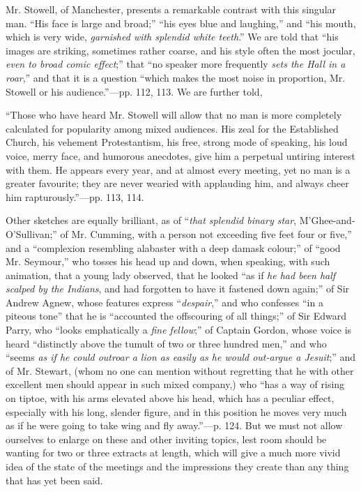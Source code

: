 Mr. Stowell,
of Manchester, presents a remarkable contrast with this singular man. ``His face is large and broad;''
``his eyes blue and laughing,'' and ``his mouth, which is very wide, \emph{garnished with splendid white teeth}.''
We are told that ``his images are striking, sometimes rather coarse,
and his style often the most jocular, \emph{even to broad comic effect};''
that ``no speaker more frequently \emph{sets the Hall in a roar},''
and that it is a question ``which makes the most noise in proportion,
Mr. Stowell or his audience.''—pp. 112, 113. We are further told,

``Those
who have heard Mr. Stowell will allow that no man is more completely
calculated for popularity among mixed audiences. His zeal for the
Established Church, his vehement Protestantism, his free, strong
mode of speaking, his loud voice, merry face, and humorous anecdotes,
give him a perpetual untiring interest with them. He appears every year,
and at almost every meeting, yet no man is a greater favourite; they are
never wearied with applauding him, and always cheer him
rapturously.''—pp. 113, 114.

Other
sketches are equally brilliant, as of ``\emph{that splendid binary star},
M'Ghee-and-O'Sullivan;'' of Mr. Cumming, with a person not
exceeding five feet four or five,'' and a ``complexion resembling
alabaster with a deep damask colour;'' of ``good Mr. Seymour,'' who
tosses his head up and down, when speaking, with such animation, that a
young lady observed, that he looked ``as if \emph{he had been half scalped
by the Indians}, and had forgotten to have it fastened down again;''
of Sir Andrew Agnew, whose features express ``\emph{despair},'' and
who confesses ``in a piteous tone'' that he is ``accounted the
offscouring of all things;'' of Sir Edward Parry, who ``looks
emphatically a \emph{fine fellow};'' of Captain Gordon, whose voice is
heard ``distinctly above the tumult of two or three hundred men,'' and
who ``seems \emph{as if he could outroar a lion as easily as he would
out-argue a Jesuit};'' and of Mr. Stewart, (whom no one can mention
without regretting that he with other excellent men should appear in
such mixed company,) who ``has a way of rising on tiptoe, with his arms
elevated above his head, which has a peculiar effect, especially with
his long, slender figure, and in this position he moves very much as if
he were going to take wing and fly away.''—p. 124. But we must not
allow ourselves to enlarge on these and other inviting topics, lest room
should be wanting for two or three extracts at length, which will give a
much more vivid idea of the state of the meetings and the impressions
they create than any thing that has yet been said.


